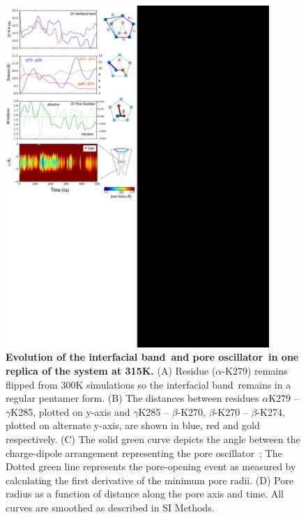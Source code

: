 \documentclass[9pt,onecolumn,oneside,lineno]{pnas-new}
\newcommand{\fivering}{interfacial band~}
\newcommand{\triad}{pore oscillator~}
\begin{document}
\begin{figure}
\begin{center}
\includegraphics[width = 100mm]{figures_2/pore_opening_events_K315_1.pdf}
\end{center}
\caption{{\bf Evolution of the \fivering and \triad in one replica of the \WT system at 315K.} (A) Residue ($\alpha$-K279) remains flipped from 300K simulations so the \fivering remains in a regular pentamer form. (B) The distances between residues $\alpha$K279 -- $\gamma$K285, plotted on y-axis and  $\gamma$K285 -- $\beta$-K270, $\beta$-K270 -- $\beta$-K274, plotted on alternate y-axis, are shown in blue, red and gold respectively. (C) The solid green curve depicts the angle between the charge-dipole arrangement representing the \triad; The Dotted green line represents the pore-opening event as measured by calculating the  first derivative of the minimum pore radii. (D) Pore radius as a function of distance along the pore axis and time.  All curves are smoothed as described in SI Methods.}
\end{figure}
\end{document}

